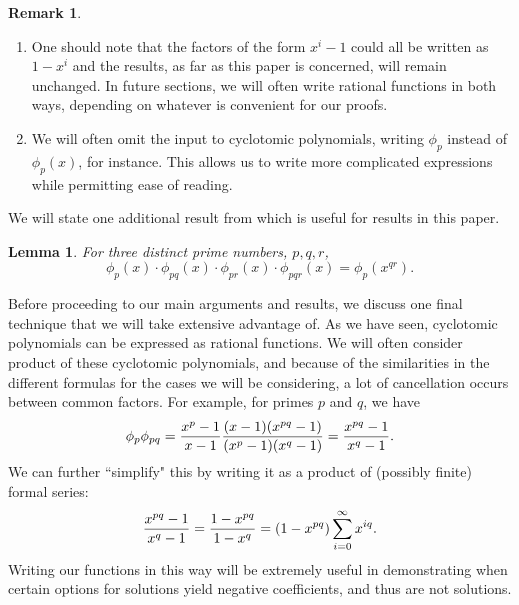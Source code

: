 \documentclass[11pt]{amsart}
\numberwithin{equation}{section}
\theoremstyle{plain}
\newtheorem{lemma}[equation]{Lemma}
\theoremstyle{definition}
\newtheorem{remark}[equation]{Remark}
\begin{document}
\begin{remark}\leavevmode
\begin{enumerate}
\item 
One should note that the factors of the form $x^i-1$ could all be written as $1-x^i$ and the results, as far as this paper is concerned, will remain unchanged. In future sections, we will often write rational functions in both ways, depending on whatever is convenient for our proofs.
\item We will often omit the input to cyclotomic polynomials, writing $\phi_p$ instead of $\phi_p(x)$, for instance.  This allows us to write more complicated expressions while permitting ease of reading.
\end{enumerate}
\end{remark}

We will state one additional result from \cite{firstpaper} which is useful for results in this paper.

%


\begin{lemma}\label{thm:josh_pqr}
For three distinct prime numbers, $p,q,r$,
$$\phi_p(x)\cdot\phi_{pq}(x)\cdot\phi_{pr}(x)\cdot\phi_{pqr}(x)=\phi_p(x^{qr}).$$
\end{lemma}


Before proceeding to our main arguments and results, we discuss one final technique that we will take extensive advantage of. As we have seen, cyclotomic polynomials can be expressed as rational functions. We will often consider product of these cyclotomic polynomials, and because of the similarities in the different formulas for the cases we will be considering, a lot of cancellation occurs between common factors. For example, for primes $p$ and $q$, we have 
\[\phi_p\phi_{pq}={x^p-1\over x-1}{(x-1)(x^{pq}-1)\over (x^p-1)(x^q-1)}={x^{pq}-1\over x^q-1}.\]
We can further ``simplify" this by writing it as a product of (possibly finite) formal series:
\[{x^{pq}-1\over x^q-1}={1-x^{pq}\over 1-x^q}=(1-x^{pq})\sum_{i=0}^\infty x^{iq}.\]
Writing our functions in this way will be extremely useful in demonstrating when certain options for solutions yield negative coefficients, and thus are not solutions. 

\end{document}
